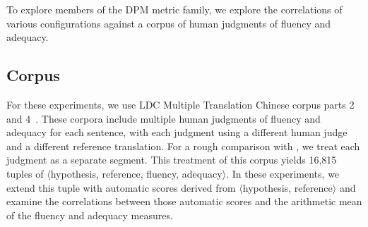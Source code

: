 \documentclass{kluwer}    %
\begin{document}
\begin{article}
To explore members of the DPM metric family, we explore the
correlations of various configurations against a corpus of human
judgments of fluency and adequacy.

\subsection{Corpus}
\label{sec:facorpus}
For these experiments, we use LDC Multiple Translation Chinese corpus
parts 2~\cite{LDC03MTC2} and 4~\cite{LDC06MTC4}.  These corpora
include multiple human judgments of fluency and adequacy for each
sentence, with each judgment using a different human judge and a
different reference translation.  For a rough comparison with , we treat
each judgment as a separate segment.
%
This treatment of this corpus yields 16,815 tuples of
$\langle$hypothesis, reference, fluency, adequacy$\rangle$.  In these
experiments, we extend this tuple with automatic scores derived from
$\langle$hypothesis, reference$\rangle$ and examine the
correlations  between those automatic scores and the arithmetic mean
of the fluency and adequacy measures.


\end{article}
\end{document}
